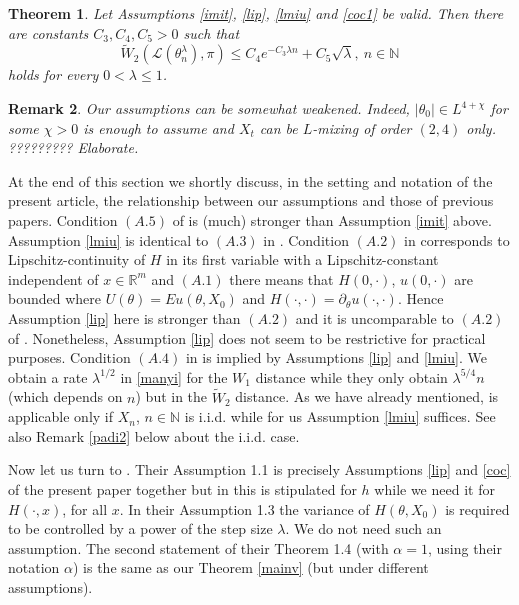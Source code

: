 \documentclass[a4paper,draft]{article}
\newtheorem{theorem}{Theorem}[section]
\newtheorem{remark}[theorem]{Remark}
\begin{document}
\begin{theorem}\label{mainw} Let Assumptions \ref{imit}, \ref{lip}, \ref{lmiu} and \ref{coc1}
be valid. Then there are constants
$C_3,C_4,C_5>0$ such that
\begin{equation}\label{mennyi}
\tilde{W}_2(\mathcal{L}(\theta^{\lambda}_n),\pi)\leq C_4 e^{-C_3\lambda n} +C_5\sqrt{\lambda},\ n\in\mathbb{N}
\end{equation}
holds for every $0<\lambda\leq 1$.
\end{theorem}

\begin{remark}{\rm Our assumptions can be somewhat weakened. Indeed, 
$|\theta_0|\in L^{4+\chi}$ for some $\chi>0$ is enough to assume and $X_t$ can be $L$-mixing of
order $(2,4)$ only. ????????? Elaborate.}
\end{remark}

At the end of this section we shortly discuss, in the setting and notation of the present article, 
the relationship between our assumptions and those of
previous papers. Condition $(A.5)$ of \cite{raginsky} is (much) stronger than Assumption \ref{imit}
above. Assumption \ref{lmiu} is identical to $(A.3)$ in \cite{raginsky}.
Condition $(A.2)$ in \cite{raginsky} corresponds to Lipschitz-continuity of $H$
in its first variable with a Lipschitz-constant independent of $x\in\mathbb{R}^m$ 
and $(A.1)$ there means that $H(0,\cdot)$, $u(0,\cdot)$ are bounded 
where $U(\theta)=Eu(\theta,X_0)$ and $H(\cdot,\cdot)=\partial_{\theta}u(\cdot,\cdot)$. 
Hence Assumption \ref{lip} here is stronger than $(A.2)$ and it is uncomparable to $(A.2)$ of \cite{raginsky}.
Nonetheless, Assumption \ref{lip} does not seem to be restrictive for practical purposes. 
Condition $(A.4)$ in \cite{raginsky} is implied by Assumptions \ref{lip} and \ref{lmiu}.
We obtain a rate $\lambda^{1/2}$ in \eqref{manyi} for the $W_1$
distance while they only obtain $\lambda^{5/4}n$ (which depends on $n$) 
but in the $\tilde{W}_2$ distance. As we have already mentioned, \cite{raginsky} is applicable
only if $X_n$, $n\in\mathbb{N}$ is i.i.d. while for us Assumption \ref{lmiu} suffices. See
also Remark \ref{padi2} below about the i.i.d. case.

Now let us turn to \cite{alex}. Their Assumption 1.1 is precisely Assumptions \ref{lip} and
\ref{coc} of the present paper together but in \cite{alex} this is stipulated for $h$
while we need it for $H(\cdot,x)$, for all $x$. In their Assumption 1.3 the variance of $H(\theta,X_0)$
is required to be controlled by a power of the step size $\lambda$. We do not need
such an assumption. The second statement of their 
Theorem 1.4 (with $\alpha=1$, using their notation $\alpha$) is the same as our Theorem \ref{mainv}
(but under different assumptions).
   
\end{document}
